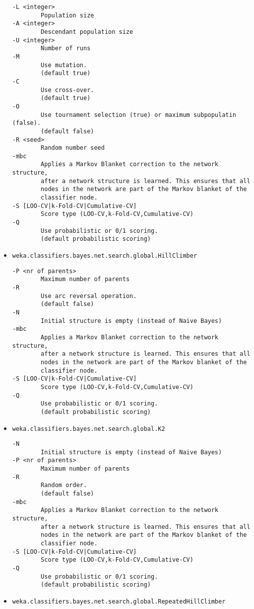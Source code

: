 \documentclass[a4paper]{article}
\begin{document}
\begin{itemize}
  \begin{verbatim}
-L <integer>
        Population size
-A <integer>
        Descendant population size
-U <integer>
        Number of runs
-M
        Use mutation.
        (default true)
-C
        Use cross-over.
        (default true)
-O
        Use tournament selection (true) or maximum subpopulatin (false).
        (default false)
-R <seed>
        Random number seed
-mbc
        Applies a Markov Blanket correction to the network structure,
        after a network structure is learned. This ensures that all
        nodes in the network are part of the Markov blanket of the
        classifier node.
-S [LOO-CV|k-Fold-CV|Cumulative-CV]
        Score type (LOO-CV,k-Fold-CV,Cumulative-CV)
-Q
        Use probabilistic or 0/1 scoring.
        (default probabilistic scoring)
  \end{verbatim}
\item \texttt{weka.classifiers.bayes.net.search.global.HillClimber}
  \begin{verbatim}
-P <nr of parents>
        Maximum number of parents
-R
        Use arc reversal operation.
        (default false)
-N
        Initial structure is empty (instead of Naive Bayes)
-mbc
        Applies a Markov Blanket correction to the network structure,
        after a network structure is learned. This ensures that all
        nodes in the network are part of the Markov blanket of the
        classifier node.
-S [LOO-CV|k-Fold-CV|Cumulative-CV]
        Score type (LOO-CV,k-Fold-CV,Cumulative-CV)
-Q
        Use probabilistic or 0/1 scoring.
        (default probabilistic scoring)
  \end{verbatim}
\item \texttt{weka.classifiers.bayes.net.search.global.K2}
  \begin{verbatim}
-N
        Initial structure is empty (instead of Naive Bayes)
-P <nr of parents>
        Maximum number of parents
-R
        Random order.
        (default false)
-mbc
        Applies a Markov Blanket correction to the network structure,
        after a network structure is learned. This ensures that all
        nodes in the network are part of the Markov blanket of the
        classifier node.
-S [LOO-CV|k-Fold-CV|Cumulative-CV]
        Score type (LOO-CV,k-Fold-CV,Cumulative-CV)
-Q
        Use probabilistic or 0/1 scoring.
        (default probabilistic scoring)
  \end{verbatim}
\item \texttt{weka.classifiers.bayes.net.search.global.RepeatedHillClimber}
  \begin{verbatim}

\end{verbatim}
\end{itemize}
\end{document}
